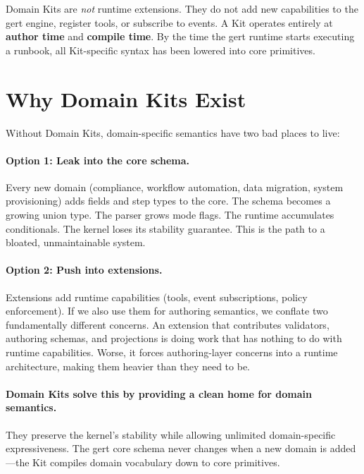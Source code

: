 Domain Kits are \emph{not} runtime extensions. They do not add new capabilities
to the gert engine, register tools, or subscribe to events. A Kit operates
entirely at \textbf{author time} and \textbf{compile time}. By the time the
gert runtime starts executing a runbook, all Kit-specific syntax has been
lowered into core primitives.

\section{Why Domain Kits Exist}
\label{sec:why-kits}

Without Domain Kits, domain-specific semantics have two bad places to live:

\paragraph{Option 1: Leak into the core schema.}
Every new domain (compliance, workflow automation, data migration, system
provisioning) adds fields and step types to the core. The schema becomes a
growing union type. The parser grows mode flags. The runtime accumulates
conditionals. The kernel loses its stability guarantee. This is the path to a
bloated, unmaintainable system.

\paragraph{Option 2: Push into extensions.}
Extensions add runtime capabilities (tools, event subscriptions, policy
enforcement). If we also use them for authoring semantics, we conflate two
fundamentally different concerns. An extension that contributes validators,
authoring schemas, and projections is doing work that has nothing to do with
runtime capabilities. Worse, it forces authoring-layer concerns into a runtime
architecture, making them heavier than they need to be.

\paragraph{Domain Kits solve this by providing a clean home for domain
semantics.} They preserve the kernel's stability while allowing unlimited
domain-specific expressiveness. The gert core schema never changes when a new
domain is added---the Kit compiles domain vocabulary down to core primitives.

